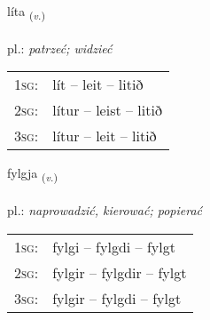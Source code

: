 \documentclass[frontgrid, backgrid]{flacards}\usepackage[]{graphicx}\usepackage[]{xcolor}
\begin{document}
\renewcommand{\flhead}{\vskip5pt \fboxsep=0pt {\small\bfseries\footnotesize Sagnorð | czasownik}}
\renewcommand{\fcfoot}{\vskip5pt \fboxsep=0pt \hspace{2pt}{\small\bfseries\footnotesize 1K}}

\renewcommand{\blhead}{\vskip5pt {\small\bfseries\footnotesize Sagnorð | czasownik }}
\renewcommand{\bcfoot}{\vskip5pt \hspace{2pt}{\small\bfseries\footnotesize 1K}}


{líta \small{\textsubscript{(\textit{v.})}} \\[1ex] %
\textphonetic{[liːta]} \\
pl.: \emph{patrzeć; widzieć} \\  [2ex]
\renewcommand*{\arraystretch}{0.8}
\begin{tabular}{p{1cm}l}
\textsc{1sg}: & lít -- leit -- litið \\ 
\textsc{2sg}: & lítur -- leist -- litið \\ 
\textsc{3sg}: & lítur -- leit -- litið \\ 
\end{tabular}
}

\renewcommand{\flhead}{\vskip5pt \fboxsep=0pt {\small\bfseries\footnotesize Sagnorð | czasownik}}
\renewcommand{\fcfoot}{\vskip5pt \fboxsep=0pt \hspace{2pt}{\small\bfseries\footnotesize 1K}}

\renewcommand{\blhead}{\vskip5pt {\small\bfseries\footnotesize Sagnorð | czasownik }}
\renewcommand{\bcfoot}{\vskip5pt \hspace{2pt}{\small\bfseries\footnotesize 1K}}


{fylgja \small{\textsubscript{(\textit{v.})}} \\[1ex] %
\textphonetic{[fɪlca]} \\
pl.: \emph{naprowadzić, kierować; popierać} \\  [2ex]
\renewcommand*{\arraystretch}{0.8}
\begin{tabular}{p{1cm}l}
\textsc{1sg}: & fylgi -- fylgdi -- fylgt \\ 
\textsc{2sg}: & fylgir -- fylgdir -- fylgt \\ 
\textsc{3sg}: & fylgir -- fylgdi -- fylgt \\ 
\end{tabular}
}
\end{document}

